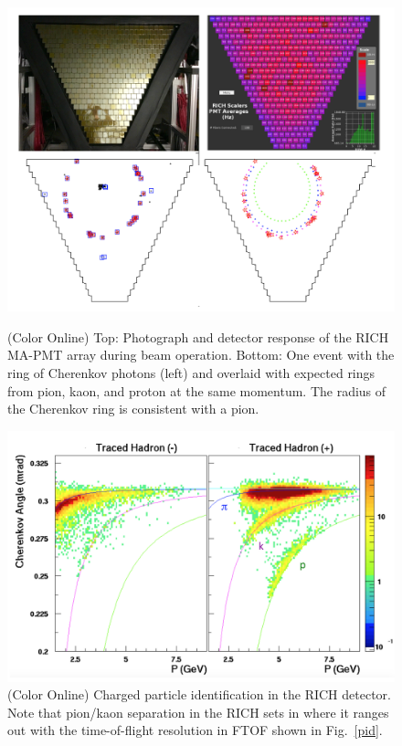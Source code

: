\documentclass[final,3p,twocolumn]{elsarticle}
\begin{document}
\begin{figure}[t!]
\centerline{\includegraphics[width=1.0\columnwidth]{rich-event.png}}
\caption{(Color Online) Top: Photograph and detector response of the RICH MA-PMT array during beam operation. Bottom: One
event with the ring of Cherenkov photons (left) and overlaid with expected rings from pion, kaon, and proton at
the same momentum. The radius of the Cherenkov ring is consistent with a pion.}
\label{rich-event}
\vspace{0.3cm}\centerline{\includegraphics[width=1.0\columnwidth]{RICH_rec.png}}
\caption{(Color Online) Charged particle identification in the RICH detector. Note that pion/kaon separation in the RICH sets
in where it ranges out with the time-of-flight resolution in FTOF shown in Fig.~\ref{pid}.}
\label{rich_rec}
\end{figure}
\end{document}

